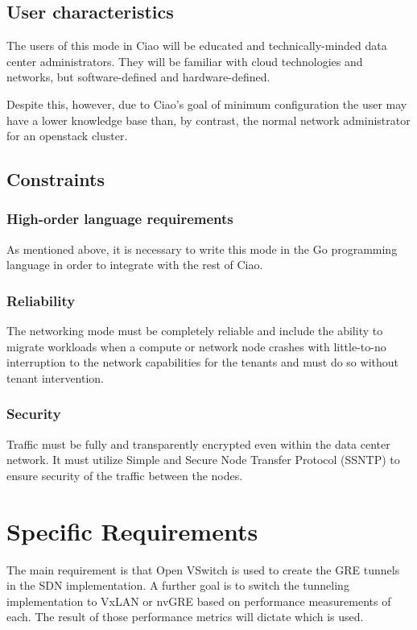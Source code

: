 \documentclass[10pt,letterpaper,onecolumn,draftclsnofoot]{IEEEtran}
\begin{document}
\subsection{User characteristics}

The users of this mode in Ciao will be educated and technically-minded data
center administrators. They will be familiar with cloud technologies and
networks, but software-defined and hardware-defined.

Despite this, however, due to Ciao's goal of minimum configuration the user may
have a lower knowledge base than, by contrast, the normal network administrator
for an openstack cluster.

\subsection{Constraints}

\subsubsection{High-order language requirements}

As mentioned above, it is necessary to write this mode in the Go programming
language in order to integrate with the rest of Ciao.

\subsubsection{Reliability}

The networking mode must be completely reliable and include the ability to
migrate workloads when a compute or network node crashes with little-to-no
interruption to the network capabilities for the tenants and must do so without
tenant intervention.

\subsubsection{Security}

Traffic must be fully and transparently encrypted even within the data center
network. It must utilize Simple and Secure Node Transfer Protocol (SSNTP) to
ensure security of the traffic between the nodes.

\section{Specific Requirements}

The main requirement is that Open VSwitch is used to create the GRE tunnels in
the SDN implementation. A further goal is to switch the tunneling implementation
to VxLAN or nvGRE based on performance measurements of each. The result of those
performance metrics will dictate which is used.
\end{document}
